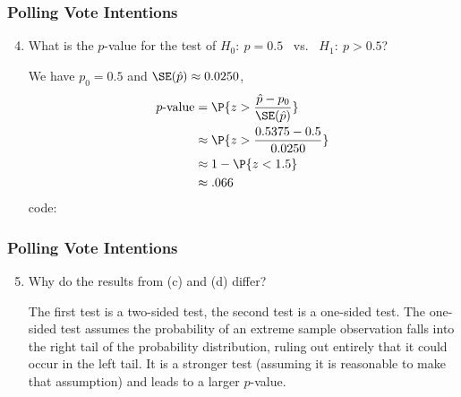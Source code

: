 \begin{frame}
\frametitle{Polling Vote Intentions}
\ask
\begin{enumerate}\setcounter{enumi}{3}

\item What is the $p$-value for the test of $H_{0}{:}~ p=0.5$ ~vs.~ $H_{1}{:}~ p > 0.5$?


\begin{answer}
We have $p_0=0.5$ and $\SE(\hat{p})\approx0.0250$, 
\begin{align*}
p\text{-value} 
  & = \P{ z > \frac{\hat{p}-p_0}{\SE(\hat{p})} }\\
  & \approx \P{z > \frac{0.5375-0.5}{0.0250}}\\
  & \approx 1-\P{z < 1.5}\\
  & \approx .066
\end{align*}
\Rlang code:\ 
\newline
  \hspace*{30pt} 
\end{answer}

\end{enumerate}
\end{frame}


\begin{frame}
\frametitle{Polling Vote Intentions}
\ask
\begin{enumerate}\setcounter{enumi}{4}

\item Why do the results from (c) and (d) differ?

\begin{answer}
The first test is a two-sided test, the second test is a one-sided test. The one-sided test assumes the probability of an extreme sample observation falls into the right tail of the probability distribution, ruling out entirely that it could occur in the left tail. It is a stronger test (assuming it is reasonable to make that assumption) and leads to a larger $p$-value.
\end{answer}

\end{enumerate}
\end{frame}


